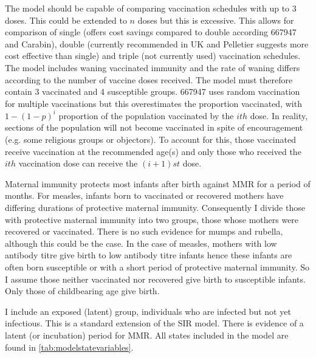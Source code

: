 \documentclass[a4paper,11pt] {scrartcl}
\begin{document}
The model should be capable of comparing vaccination schedules with up to 3 doses. This could be extended to $n$ doses but this is excessive. This allows for comparison of single (offers cost savings compared to double according 667947\cite{mystudy2012} and Carabin\cite{carabin2003future}), double (currently recommended in UK and Pelletier\cite{pelletier1998benefit} suggests more cost effective than single) and triple (not currently used) vaccination schedules. The model includes waning vaccinated immunity and the rate of waning differs according to the number of vaccine doses received. The model must therefore contain 3 vaccinated and 4 susceptible groups. 667947\cite{mystudy2012} uses random vaccination for multiple vaccinations but this overestimates the proportion vaccinated, with $1-(1-p)^i$ proportion of the population vaccinated by the $ith$ dose. In reality, sections of the population will not become vaccinated in spite of encouragement (e.g. some religious groups or objectors). To account for this, those vaccinated receive vaccination at the recommended age(s) and only those who received the $ith$ vaccination dose can receive the $\left(i+1\right)st$ dose.

Maternal immunity protects most infants after birth against MMR for a period of months\cite{leuridan2010early,leuridan2011kinetics,leuridan2012maternal}. For measles, infants born to vaccinated or recovered mothers have differing durations of protective maternal immunity\cite{leuridan2010early}. Consequently I divide those with protective maternal immunity into two groups, those whose mothers were recovered or vaccinated. There is no such evidence for mumps and rubella, although this could be the case. In the case of measles, mothers with low antibody titre give birth to low antibody titre infants\cite{goncalves1999transplacental} hence these infants are often born susceptible or with a short period of protective maternal immunity. So I assume those neither vaccinated nor recovered give birth to susceptible infants. Only those of childbearing age give birth. 

I include an exposed (latent) group, individuals who are infected but not yet infectious. This is a standard extension of the SIR model\cite{anderson1985age,schenzle1984age,levin2011global}. There is evidence of a latent (or incubation) period for MMR\cite{naniche2009human,hviid2008mumps,banatvala2004rubella}. All states included in the model are found in \autoref{tab:modelstatevariables}.
\end{document}
